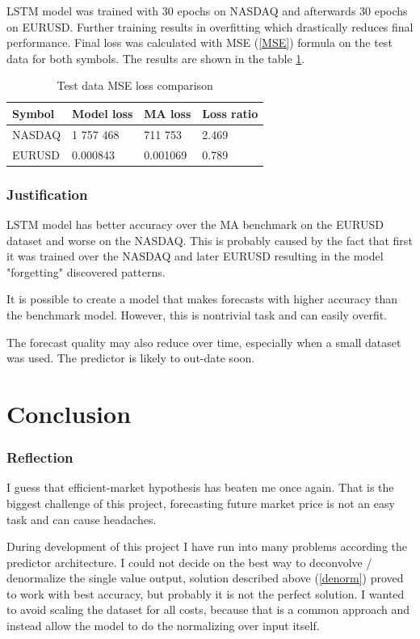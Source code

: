 \documentclass[a4paper,12pt]{article}
\begin{document}
LSTM model was trained with 30 epochs on NASDAQ and afterwards 30 epochs on EURUSD. Further training results in overfitting which drastically reduces final performance. Final loss was calculated with MSE (\ref{MSE}) formula on the test data for both symbols. The results are shown in the table \ref{loss}.
\begin{table}
	\label{loss}
	\centering
	\begin{tabular}{l|l|l|l}
		Symbol & Model loss & MA loss  & Loss ratio \\ \hline
		NASDAQ & 1 757 468  & 711 753  & 2.469      \\
		EURUSD & 0.000843   & 0.001069 & 0.789
	\end{tabular}
	\caption{Test data MSE loss comparison}
\end{table}

\section{Justification}
LSTM model has better accuracy over the MA benchmark on the EURUSD dataset and worse on the NASDAQ. This is probably caused by the fact that first it was trained over the NASDAQ and later EURUSD resulting in the model "forgetting" discovered patterns.

It is possible to create a model that makes forecasts with higher accuracy than the benchmark model. However, this is nontrivial task and can easily overfit.

The forecast quality may also reduce over time, especially when a small dataset was used. The predictor is likely to out-date soon.


\part{Conclusion}
\section{Reflection}
I guess that efficient-market hypothesis has beaten me once again. That is the biggest challenge of this project, forecasting future market price is not an easy task and can cause headaches.

During development of this project I have run into many problems according the predictor architecture. I could not decide on the best way to deconvolve / denormalize the single value output, solution described above (\ref{denorm}) proved to work with best accuracy, but probably it is not the perfect solution. I wanted to avoid scaling the dataset for all costs, because that is a common approach and instead allow the model to do the normalizing over input itself.
\end{document}
